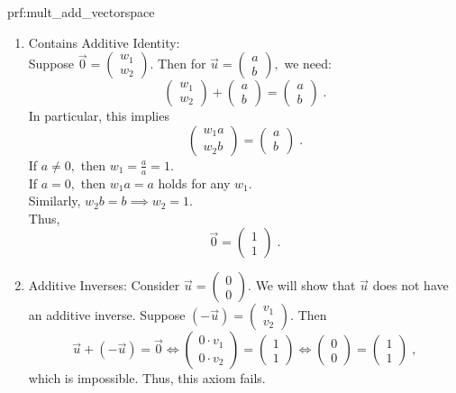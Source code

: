 \begin{prf}{prf:mult_add_vectorspace}
\begin{enumerate}
\item Contains Additive Identity: \\
Suppose $\vec{0} = \begin{pmatrix}
w_1 \\
w_2
\end{pmatrix}.$ Then for $\vec{u} = \begin{pmatrix}
a \\
b
\end{pmatrix},$ we need:
$$\begin{pmatrix}
w_1 \\
w_2
\end{pmatrix} + \begin{pmatrix}
a \\
b
\end{pmatrix} = \begin{pmatrix}
a \\
b
\end{pmatrix}\;.$$
In particular, this implies
$$\begin{pmatrix}
w_1a \\
w_2b
\end{pmatrix} = \begin{pmatrix}
a \\
b
\end{pmatrix}\;.$$
If $a \neq 0,$ then $w_1 = \frac{a}{a} = 1.$ \\
If $a = 0,$ then $w_1a=a$ holds for any $w_1.$ \\
Similarly, $w_2b=b \implies w_2=1$. \\
Thus, $$\vec{0} = \begin{pmatrix}
1 \\
1
\end{pmatrix}\;.$$

\item Additive Inverses: Consider $\vec{u} = \begin{pmatrix}
0 \\
0
\end{pmatrix}$. We will show that $\vec{u}$ does not have an additive inverse. Suppose $(-\vec{u}) = \begin{pmatrix}
v_1 \\
v_2
\end{pmatrix}.$ Then
$$\vec{u} + (-\vec{u}) = \vec{0} \iff \begin{pmatrix}
0 \cdot v_1 \\
0 \cdot v_2
\end{pmatrix} = \begin{pmatrix}
1 \\
1
\end{pmatrix} \iff  \begin{pmatrix}
0 \\
0
\end{pmatrix} = \begin{pmatrix}
1 \\
1
\end{pmatrix}\;,$$
which is impossible. Thus, this axiom fails.


\end{enumerate}
\end{prf}
